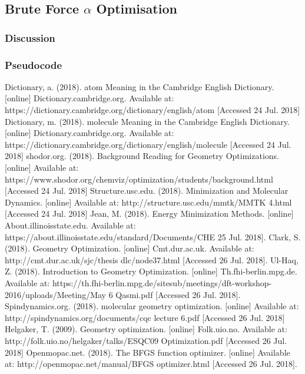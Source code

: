\documentclass[conference]{IEEEtran}
\begin{document}
\subsection{Brute Force $\alpha$ Optimisation}
\subsubsection{Discussion}
\subsubsection{Pseudocode}



\begin{thebibliography}{00}
 Dictionary, a. (2018). atom Meaning in the Cambridge English Dictionary. [online] 
Dictionary.cambridge.org.
Available at: https://dictionary.cambridge.org/dictionary/english/atom [Accessed 24 Jul. 2018]
 Dictionary, m. (2018). molecule Meaning in the Cambridge English Dictionary. [online] Dictionary.cambridge.org.
Available at: https://dictionary.cambridge.org/dictionary/english/molecule [Accessed 24 Jul. 2018]
 shodor.org. (2018). Background Reading for Geometry Optimizations. [online]
Available at: https://www.shodor.org/chemviz/optimization/students/background.html [Accessed 24 Jul. 2018]
 Structure.usc.edu. (2018). Minimization and Molecular Dynamics. [online]
Available at: http://structure.usc.edu/mmtk/MMTK 4.html [Accessed 24 Jul. 2018]
 Jean, M. (2018). Energy Minimization Methods. [online] About.illinoisstate.edu.
Available at: https://about.illinoisstate.edu/standard/Documents/CHE%
25 Jul. 2018].
 Clark, S. (2018). Geometry Optimization. [online] Cmt.dur.ac.uk.
Available at: http://cmt.dur.ac.uk/sjc/thesis dlc/node37.html [Accessed 26 Jul. 2018].
 Ul-Haq, Z. (2018). Introduction to Geometry Optimization. [online] Th.fhi-berlin.mpg.de.
Available at: https://th.fhi-berlin.mpg.de/sitesub/meetings/dft-workshop-2016/uploads/Meeting/May 6 Qasmi.pdf
[Accessed 26 Jul. 2018].
Spindynamics.org. (2018). molecular geometry optimization. [online]
Available at: http://spindynamics.org/documents/cqc lecture 6.pdf [Accessed 26 Jul. 2018]
Helgaker, T. (2009). Geometry optimization. [online] Folk.uio.no.
Available at: http://folk.uio.no/helgaker/talks/ESQC09 Optimization.pdf [Accessed 26 Jul. 2018]
Openmopac.net. (2018). The BFGS function optimizer. [online]
Available at: http://openmopac.net/manual/BFGS optimizer.html [Accessed 26 Jul. 2018].

\end{thebibliography}
\end{document}
